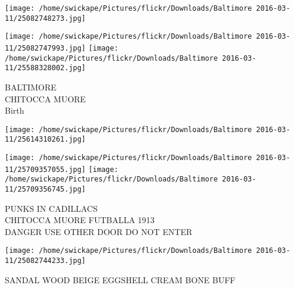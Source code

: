 \documentclass[10pt,letterpaper]{article}
\begin{document}
\texttt{[image: /home/swickape/Pictures/flickr/Downloads/Baltimore 2016-03-11/25082748273.jpg]}

\vspace{0.25in}
\texttt{[image: /home/swickape/Pictures/flickr/Downloads/Baltimore 2016-03-11/25082747993.jpg]}
\texttt{[image: /home/swickape/Pictures/flickr/Downloads/Baltimore 2016-03-11/25588328002.jpg]}

BALTIMORE\\
CHITOCCA MUORE\\
Birth\\
\pagebreak

\texttt{[image: /home/swickape/Pictures/flickr/Downloads/Baltimore 2016-03-11/25614310261.jpg]}

\vspace{0.25in}
\texttt{[image: /home/swickape/Pictures/flickr/Downloads/Baltimore 2016-03-11/25709357055.jpg]}
\texttt{[image: /home/swickape/Pictures/flickr/Downloads/Baltimore 2016-03-11/25709356745.jpg]}

PUNKS IN CADILLACS\\
CHITOCCA MUORE FUTBALLA 1913\\
DANGER USE OTHER DOOR DO NOT ENTER\\
\pagebreak

\texttt{[image: /home/swickape/Pictures/flickr/Downloads/Baltimore 2016-03-11/25082744233.jpg]}

SANDAL WOOD BEIGE EGGSHELL CREAM BONE BUFF\\
\pagebreak
\end{document}
